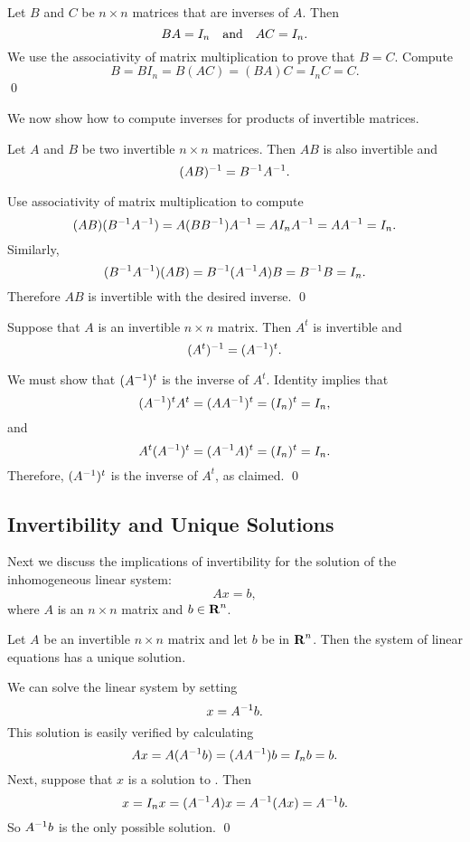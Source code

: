 \proof
Let $B$ and $C$ be $n\times n$ matrices that are inverses of $A$.  Then
\[
BA=I_n \quad\mbox{and}\quad AC=I_n.
\]
We use the associativity of matrix multiplication to
prove that $B=C$.  Compute
\[
B = BI_n = B(AC) = (BA)C = I_nC = C.
\]
\qed

We now show how to compute inverses for products of invertible
matrices.

\begin{prop} \label{P:invprod} 
Let $A$ and $B$ be two invertible $n\times n$ matrices.  Then
$AB$ is also invertible and
\[
(AB)^{-1} = B^{-1} A^{-1}.
\]
\end{prop}

\proof  Use associativity of matrix multiplication to compute
\[
(AB)(B^{-1} A^{-1}) = A(BB^{-1})A^{-1} = AI_nA^{-1} = AA^{-1}=I_n.
\]
Similarly,
\[
(B^{-1} A^{-1})(AB) = B^{-1}(A^{-1} A)B = B^{-1} B = I_n.
\]
Therefore $AB$ is invertible with the desired inverse. \qed

\begin{prop} \label{L:transposeinv} 
Suppose that $A$ is an invertible $n\times n$ matrix.  Then
$A^t$ is invertible and
\[
(A^t)^{-1} = (A^{-1})^t.
\]
\end{prop}

\proof  We must show that $(A^{-1})^t$ is the inverse of $A^t$.  Identity
 implies that
\[
(A^{-1})^tA^t = (AA^{-1})^t = (I_n)^t = I_n,
\]
and
\[
A^t(A^{-1})^t = (A^{-1} A)^t = (I_n)^t = I_n.
\]
Therefore, $(A^{-1})^t$ is the inverse of $A^t$, as claimed.  \qed

\subsection*{Invertibility and Unique Solutions}

Next we discuss the implications of invertibility for the
solution of the inhomogeneous linear system:  
\begin{equation}  \label{squarematrix}
Ax=b,
\end{equation}
where $A$ is an $n\times n$ matrix and $b\in\mbox{$\bf{R}$}^n$.

\begin{prop} \label{P:inv=>unique}
Let $A$ be an invertible $n\times n$ matrix and let $b$ be in $\mbox{$\bf{R}$}^n$.
Then the system of linear equations  has a unique solution.
\end{prop}

\proof  We can solve the linear system  by setting
\begin{equation}  \label{soln}
x=A^{-1} b.
\end{equation}
This solution is easily verified by calculating
\[
Ax=A(A^{-1} b) = (AA^{-1})b = I_nb = b.
\]
Next, suppose that $x$ is a solution to .  Then
\[
x = I_n x = (A^{-1} A)x = A^{-1}(Ax) = A^{-1} b.
\]
So $A^{-1} b$ is the only possible solution.  \qed

